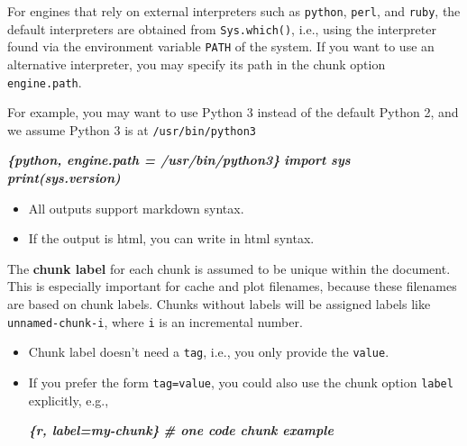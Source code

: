 \documentclass[
]{book}
\newenvironment{Shaded}{\begin{snugshade}}{\end{snugshade}}
\newcommand{\InformationTok}[1]{\textcolor[rgb]{0.56,0.35,0.01}{\textbf{\textit{#1}}}}
\providecommand{\tightlist}{%
  \setlength{\itemsep}{0pt}\setlength{\parskip}{0pt}}
\begin{document}
For engines that rely on external interpreters such as \texttt{python}, \texttt{perl}, and \texttt{ruby}, the default interpreters are obtained from \texttt{Sys.which()}, i.e., using the interpreter found via the environment variable \texttt{PATH} of the system. If you want to use an alternative interpreter, you may specify its path in the chunk option \texttt{engine.path}.

For example, you may want to use Python 3 instead of the default Python 2, and we assume Python 3 is at \texttt{/usr/bin/python3}

\begin{Shaded}
\begin{Highlighting}[]
\InformationTok{\textasciigrave{}\textasciigrave{}\textasciigrave{}\{python, engine.path = \textquotesingle{}/usr/bin/python3\textquotesingle{}\}}
\InformationTok{import sys}
\InformationTok{print(sys.version)}
\InformationTok{\textasciigrave{}\textasciigrave{}\textasciigrave{}}
\end{Highlighting}
\end{Shaded}

\begin{itemize}
\tightlist
\item
  All outputs support markdown syntax.
\item
  If the output is html, you can write in html syntax.
\end{itemize}

The \textbf{chunk label} for each chunk is assumed to be unique within the document. This is especially important for cache and plot filenames, because these filenames are based on chunk labels. Chunks without labels will be assigned labels like \texttt{unnamed-chunk-i}, where \texttt{i} is an incremental number.

\begin{itemize}
\item
  Chunk label doesn't need a \texttt{tag}, i.e., you only provide the \texttt{value}.
\item
  If you prefer the form \texttt{tag=value}, you could also use the chunk option \texttt{label} explicitly, e.g.,

\begin{Shaded}
\begin{Highlighting}[]
\InformationTok{\textasciigrave{}\textasciigrave{}\textasciigrave{}\{r, label=\textquotesingle{}my{-}chunk\textquotesingle{}\}}
\InformationTok{\# one code chunk example}
\InformationTok{\textasciigrave{}\textasciigrave{}\textasciigrave{}}
\end{Highlighting}
\end{Shaded}
\end{itemize}
\end{document}
